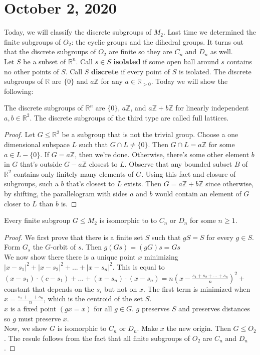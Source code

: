 \documentclass{article}
\newcommand{\vocab}[1]{\textbf{\color{blue!90}\boldmath #1}}
\newcommand{\R}{\mathbb{R}}
\newcommand{\Z}{\mathbb{Z}}
\begin{document}
\section{October 2, 2020}
Today, we will classify the discrete subgroups of $M_2$. Last time we determined the finite subgroups of $O_2$: the cyclic groups and the dihedral groups. It turns out that the discrete subgroups of $O_2$ are finite so they are $C_n$ and $D_n$ as well.\\
Let $S$ be a subset of $\R^n$. Call $s\in S$ \vocab{isolated} if some open ball around $s$ contains no other points of $S$. Call $S$ \vocab{discrete} if every point of $S$ is isolated. The discrete subgroups of $\R$ are $\{0\}$ and $a\Z$ for any $a\in\R_{>0}$. Today we will show the following:
\begin{theorem}
The discrete subgroups of $\R^n$ are $\{0\}$, $a\Z$, and $a\Z+b\Z$ for linearly independent $a,b\in \R^2$. The discrete subgroups of the third type are called full lattices.
\end{theorem}
\begin{proof}
Let $G\leq \R^2$ be a subgroup that is not the trivial group. Choose a one dimensional subspace $L$ such that $G\cap L\neq \{0\}$. Then $G\cap L=a\Z$ for some $a\in L-\{0\}$. If $G=a\Z$, then we're done. Otherwise, there's some other element $b$ in $G$ that's outside $G-a\Z$ closest to $L$. Observe that any bounded subset $B$ of $\R^2$ contains only finitely many elements of $G$. Using this fact and closure of subgroups, such a $b$ that's closest to $L$ exists. Then $G=a\Z+b\Z$ since otherwise, by shifting, the parallelogram with sides $a$ and $b$ would contain an element of $G$ closer to $L$ than $b$ is. 
\end{proof}
\begin{theorem}
Every finite subgroup $G\leq M_2$ is isomorphic to to $C_n$ or $D_n$ for some $n\geq 1$. 
\end{theorem}
\begin{proof}
We first prove that there is a finite set $S$ such that $gS=S$ for every $g\in S$. Form $G_s$ the $G$-orbit of $s$. Then $g(Gs)=(gG)s=Gs$\\
We now show there there is a unique point $x$ minimizing $|x-s_1|^2+|x-s_2|^2+...+|x-s_n|^2$. This is equal to $(x-s_1)\cdot (c-s_1)+...+(x-s_n)\cdot (x-s_n)=n(x-\frac{s_1+s_2+...+s_n}{n})^2+$ constant that depends on the $s_i$ but not on $x$. The first term is minimized when $x=\frac{s_1+...+s_n}{n}$, which is the centroid of the set $S$.\\
$x$ is a fixed point $(gx=x)$ for all $g\in G$. $g$ preserves $S$ and preserves distances so $g$ must preserve $x$.\\
Now, we show $G$ is isomorphic to $C_n$ or $D_n$. Make $x$ the new origin. Then $G\leq O_2$. The resule follows from the fact that all finite subgroups of $O_2$ are $C_n$ and $D_n$. 
\end{proof}
\end{document}
